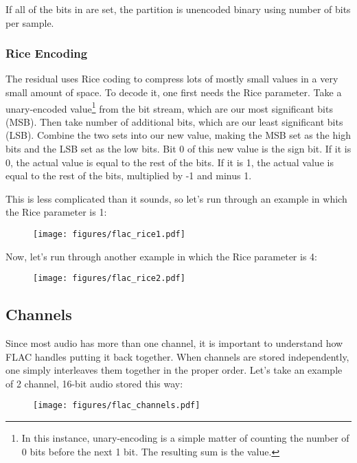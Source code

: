 If all of the bits in  are set,
the partition is unencoded binary using  number of bits per
sample.

\pagebreak

\subsubsection{Rice Encoding}
The residual uses Rice coding to compress lots of mostly small values
in a very small amount of space.
To decode it, one first needs the Rice parameter.
Take a unary-encoded value\footnote{In this instance, unary-encoding is a simple matter of
counting the number of 0 bits before the next 1 bit.
The resulting sum is the value.}
from the bit stream, which are our most
significant bits (MSB).
Then take  number of additional bits, which are our least
significant bits (LSB).
Combine the two sets into our new value,
making the MSB set as the high bits and the LSB set as the low bits.
Bit 0 of this new value is the sign bit.
If it is 0, the actual value is equal to the rest of the bits.
If it is 1, the actual value is equal to the rest of the bits,
multiplied by -1 and minus 1.

This is less complicated than it sounds, so let's run through an example
in which the Rice parameter is 1:
\begin{figure}[h]
\texttt{[image: figures/flac\_rice1.pdf]}
\end{figure}

Now, let's run through another example in which the Rice parameter is 4:
\begin{figure}[h]
\texttt{[image: figures/flac\_rice2.pdf]}
\end{figure}

\pagebreak

\subsection{Channels}
\label{flac_channels}
Since most audio has more than one channel, it is important to
understand how FLAC handles putting it back together.
When channels are stored independently, one simply interleaves
them together in the proper order.
Let's take an example of 2 channel, 16-bit audio stored this way:

\begin{figure}[h]
\texttt{[image: figures/flac\_channels.pdf]}
\end{figure}

